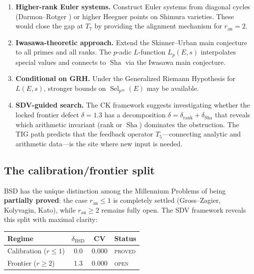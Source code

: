 \documentclass[11pt]{article}
\DeclareMathOperator{\Sha}{Sha}
\DeclareMathOperator{\Sel}{Sel}
\begin{document}
\begin{enumerate}
  \item \textbf{Higher-rank Euler systems.}  Construct Euler systems from
    diagonal cycles (Darmon--Rotger \cite{DR}) or higher Heegner points on
    Shimura varieties.  These would close the gap at $T_7$ by providing the
    alignment mechanism for $r_{\mathrm{an}} = 2$.

  \item \textbf{Iwasawa-theoretic approach.}  Extend the Skinner--Urban main
    conjecture \cite{SU} to all primes and all ranks.  The $p$-adic
    $L$-function $L_p(E,s)$ interpolates special values and connects to $\Sha$
    via the Iwasawa main conjecture.

  \item \textbf{Conditional on GRH.}  Under the Generalized Riemann Hypothesis
    for $L(E,s)$, stronger bounds on $\Sel_{p^\infty}(E)$ may be available.

  \item \textbf{SDV-guided search.}  The CK framework suggests investigating
    whether the locked frontier defect $\delta = 1.3$ has a decomposition
    $\delta = \delta_{\mathrm{rank}} + \delta_{\mathrm{Sha}}$ that reveals which
    arithmetic invariant (rank or $\Sha$) dominates the obstruction.  The TIG
    path predicts that the feedback operator $T_5$---connecting analytic and
    arithmetic data---is the site where new input is needed.
\end{enumerate}

\subsection{The calibration/frontier split}

BSD has the unique distinction among the Millennium Problems of being
\textbf{partially proved}: the case $r_{\mathrm{an}} \leq 1$ is completely
settled (Gross--Zagier, Kolyvagin, Kato), while $r_{\mathrm{an}} \geq 2$
remains fully open.  The SDV framework reveals this split with maximal clarity:

\begin{center}
\begin{tabular}{lccl}
\hline
\textbf{Regime} & $\delta_{\mathrm{BSD}}$ & CV & \textbf{Status} \\
\hline
Calibration ($r \leq 1$) & 0.0 & 0.000 & \textsc{proved} \\
Frontier ($r \geq 2$) & 1.3 & 0.000 & \textsc{open} \\
\hline
\end{tabular}
\end{center}
\end{document}
